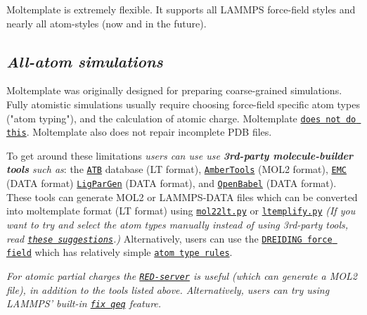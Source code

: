 \documentclass[11pt]{article}
\begin{document}
Moltemplate is extremely flexible.
It supports all LAMMPS force-field styles and nearly all atom-styles
(now and in the future).

\subsection*{\textit{All-atom simulations}}
\label{sec:all_atom_limitations}


Moltemplate was originally designed for preparing coarse-grained simulations.
Fully atomistic simulations usually require choosing
force-field specific atom types ("atom typing"),
and the calculation of atomic charge.
Moltemplate
\href{https://moltemplate.org/force_field_recommendations.html}{\tt does not do this}.
Moltemplate also does not repair incomplete PDB files.

To get around these limitations
\textit{users can use use \textbf{3rd-party molecule-builder tools} such as}:
the \href{https://atb.uq.edu.au}{\tt ATB} database (LT format),
\href{https://ambermd.org/AmberTools.php}{\tt AmberTools} (MOL2 format),
\href{http://montecarlo.sourceforge.net/}{\tt EMC} (DATA format)
\href{https://moltemplate.org/doc/moltemplate_talk_2019-8-15.pdf#page=190}{\tt LigParGen} (DATA format),
and
\href{https://open-babel.readthedocs.io/en/latest/FileFormats/The_LAMMPS_data_format.html}{\tt OpenBabel} (DATA format).
These tools can generate MOL2 or LAMMPS-DATA files
which can be converted into moltemplate format (LT format) using
\href{https://github.com/jewettaij/moltemplate/blob/master/doc/doc_mol22lt.md}{\tt mol22lt.py}
or
\href{https://github.com/jewettaij/moltemplate/blob/master/doc/doc_ltemplify.md#ltemplifypy}{\tt ltemplify.py}
\textit{(If you want to try and select the atom types
  manually instead of using 3rd-party tools, read
\href{https://moltemplate.org/force_field_recommendations.html}{\tt these suggestions}.)}
Alternatively, users can use the
\href{https://github.com/jewettaij/moltemplate/tree/master/examples/all_atom/force_field_DREIDING}{\tt DREIDING force field}
which has relatively simple
\href{https://github.com/jewettaij/moltemplate/tree/master//doc/DREIDING_Label_Manual.pdf}{\tt atom type rules}.

\textit{For atomic partial charges
the \href{https://upjv.q4md-forcefieldtools.org}{\tt RED-server}
is useful (which can generate a MOL2 file),
in addition to the tools listed above.
Alternatively, users can try using LAMMPS' built-in
\href{https://lammps.sandia.gov/doc/fix_qeq.html}{\tt fix qeq}
feature.}
\end{document}
